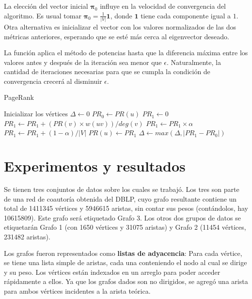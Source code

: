 \documentclass[journal]{IEEEtran}
\let\MYoriglatexcaption\caption
\renewcommand{\caption}[2][\relax]{\MYoriglatexcaption[#2]{#2}}
\begin{document}
La elección del vector inicial \(\bm{\pi}_0\) influye en la velocidad de convergencia del algoritmo. Es usual tomar \(\bm{\pi}_0 = \frac{1}{|V|} \bm{1} \), donde \(\bm{1}\) tiene cada componente igual a \(1\). Otra alternativa es inicializar el vector con los valores normalizados de las dos métricas anteriores, esperando que se esté más cerca al eigenvector deseado.

La función  aplica el método de potencias hasta que la diferencia máxima entre los valores antes y después de la iteración sea menor que \(\epsilon\). Naturalmente, la cantidad de iteraciones necesarias para que se cumpla la condición de convergencia crecerá al disminuir \(\epsilon\).

\begin{algorithm}
	\caption{PageRank} \label{alg:pagerank}
	\begin{algorithmic}
			\State Inicializar los vértices
			\Do
				\State $\Delta \gets 0$
					\State $PR_0 \gets PR(u)$
					\State $PR_1 \gets 0$
						\State $PR_1 \gets PR_1 + (PR(v) \times w(uv))/deg(v)$
					\EndFor
					\State $PR_1 \gets PR_1 \times \alpha$
					\State $PR_1 \gets PR_1 + (1-\alpha)/|V|$
					\State $PR(u) \gets PR_1$
					\State $\Delta \gets max(\Delta, |PR_1 - PR_0|)$
				\EndFor
			\doWhile{$\Delta > \epsilon$}
		\EndFunction
	\end{algorithmic}
\end{algorithm}

\section{Experimentos y resultados}
Se tienen tres conjuntos de datos sobre los cuales se trabajó. Los tres son parte de una red de coautoría obtenida del DBLP, cuyo grafo resultante contiene un total de \num{1411345} vértices y \num{5946615} aristas, sin contar sus pesos (contándolos, hay \num{10615809}). Este grafo será etiquetado Grafo 3. Los otros dos grupos de datos se etiquetarán Grafo 1 (con \num{1650} vértices y \num{31075} aristas) y Grafo 2 (\num{11454} vértices, \num{231482} aristas).

Los grafos fueron representados como \textbf{listas de adyacencia}: Para cada vértice, se tiene una lista simple de aristas, cada una conteniendo el nodo al cual se dirige y su peso. Los vértices están indexados en un arreglo para poder acceder rápidamente a ellos. Ya que los grafos dados son no dirigidos, se agregó una arista para ambos vértices incidentes a la arista teórica.
\end{document}
